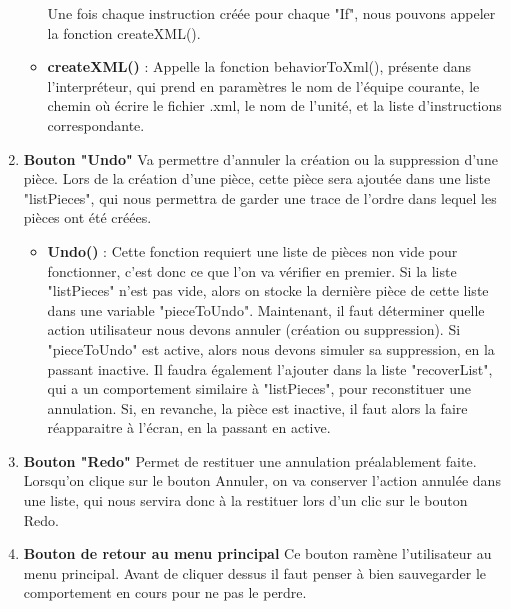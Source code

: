 \documentclass{report}
\begin{document}
\begin{enumerate}[label=\Alph*)]
\begin{itemize}
Une fois chaque instruction créée pour chaque "If", nous pouvons appeler la fonction createXML().\newline
\item\textbf{createXML()} :  \newline
Appelle la fonction behaviorToXml(), présente dans l'interpréteur, qui prend en paramètres le nom de l'équipe courante, le chemin où écrire le fichier .xml, le nom de l'unité, et la liste d'instructions correspondante.
\end{itemize}
\item\textbf{Bouton "Undo"} \newline
Va permettre d'annuler la création ou la suppression d'une pièce. Lors de la création d'une pièce, cette pièce sera ajoutée dans une liste "listPieces", qui nous permettra de garder une trace de l'ordre dans lequel les pièces ont été créées.
\smallbreak
\begin{itemize}
\item\textbf{Undo()} :  \newline
Cette fonction requiert une liste de pièces non vide pour fonctionner, c'est donc ce que l'on va vérifier en premier. Si la liste "listPieces" n'est pas vide, alors on stocke la dernière pièce de cette liste dans une variable "pieceToUndo".\newline
Maintenant, il faut déterminer quelle action utilisateur nous devons annuler (création ou suppression).\newline
Si "pieceToUndo" est active, alors nous devons simuler sa suppression, en la passant inactive. Il faudra également l'ajouter dans la liste "recoverList", qui a un comportement similaire à "listPieces", pour reconstituer une annulation.\newline
Si, en revanche, la pièce est inactive, il faut alors la faire réapparaitre à l'écran, en la passant en active.

\end{itemize}
\item\textbf{Bouton "Redo"} \newline
Permet de restituer une annulation préalablement faite. Lorsqu'on clique sur le bouton Annuler, on va conserver l'action annulée dans une liste, qui nous servira donc à la restituer lors d'un clic sur le bouton Redo.
\item\textbf{Bouton de retour au menu principal} \newline
Ce bouton ramène l'utilisateur au menu principal. Avant de cliquer dessus il faut penser à bien sauvegarder le comportement en cours pour ne pas le perdre.
\end{enumerate}
\end{document}
